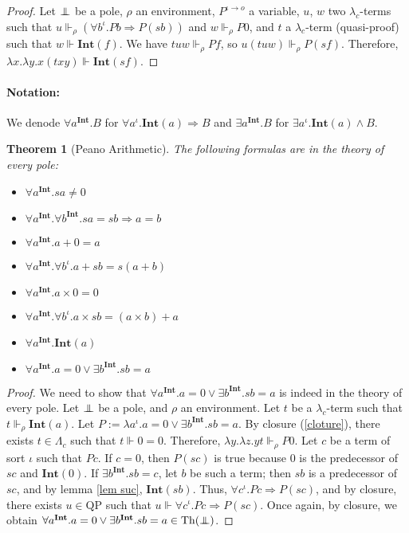 \documentclass[a4paper,12pt]{article}
\newtheorem{theo}{Theorem}[subsection]
\theoremstyle{rmqstyle}
\newcommand{\QP}{\mathrm{QP}}
\renewcommand{\int}{\mathbf{Int}}
\renewcommand{\implies}{\Rightarrow}
\newcommand{\pole}{{\protect\mathpalette{\protect\polehelper}{\bot}}} \def\polehelper#1#2{\mathrel{\rlap{$#1#2$}\mkern3mu{#1#2}}}
\newcommand{\Th}{\mathrm{Th}}
\begin{document}
\begin{proof}
Let $\pole$ be a pole, $\rho$ an environment, $P^{\iota \to o}$ a variable, $u$, $w$ two $\lambda_c$-terms such that $u \Vdash_\rho (\forall b^\iota. Pb \implies P(sb))$ and $w \Vdash_\rho P0$, and $t$ a $\lambda_c$-term (quasi-proof) such that $w \Vdash \int(f)$. We have $tuw \Vdash_\rho Pf$, so $u(tuw) \Vdash_\rho P(sf)$. Therefore, $\lambda x. \lambda y. x(txy) \Vdash \int(sf)$.
\end{proof}

\paragraph{Notation:} We denode $\forall a^\int. B$ for $\forall a^\iota. \int(a) \implies B$ and $\exists a^\int. B$ for $\exists a^\iota. \int(a) \land B$.

\begin{theo}[Peano Arithmetic]
The following formulas are in the theory of every pole:
\begin{itemize}
\setlength\itemsep{ -1 em}
\item $\forall a^\int. sa \neq 0$\\
\item $\forall a^\int. \forall b^\int. sa = sb \implies a = b$\\
\item $\forall a^\int. a + 0 = a$\\
\item $\forall a^\int. \forall b^\iota. a + sb = s(a + b)$\\
\item $\forall a^\int. a \times 0 = 0$\\
\item $\forall a^\int. \forall b^\iota. a \times sb = (a \times b) + a$\\
\item $\forall a^\int. \int(a)$\\
\item $\forall a^\int. a = 0 \lor \exists b^\int. sb = a$
\end{itemize}
\end{theo}

\begin{proof}
We need to show that $\forall a^\int. a= 0 \lor \exists b^\int. sb = a$ is indeed in the theory of every pole. Let $\pole$ be a pole, and $\rho$ an environment. Let $t$ be a $\lambda_c$-term such that $t \Vdash_\rho \int(a)$. Let $P := \lambda a^\iota. a = 0 \lor \exists b^\int. sb = a$. By closure (\ref{cloture}), there exists $t \in \Lambda_c$ such that $t \Vdash 0 = 0$. Therefore, $\lambda y. \lambda z. y t \Vdash_\rho P0$. Let $c$ be a term of sort $\iota$ such that $Pc$. If $c = 0$, then $P(sc)$ is true because $0$ is the predecessor of $sc$ and $\int(0)$. If $\exists b^\int. sb = c$, let $b$ be such a term; then $sb$ is a predecessor of $sc$, and by lemma \ref{lem suc}, $\int(sb)$. Thus, $\forall c^\iota. Pc \implies P(sc)$, and by closure, there exists $u \in \QP$ such that $u \Vdash \forall c^\iota. Pc \implies P(sc)$. Once again, by closure, we obtain $\forall a^\int. a= 0 \lor \exists b^\int. sb = a \in \Th(\pole)$.
\end{proof}
\end{document}

